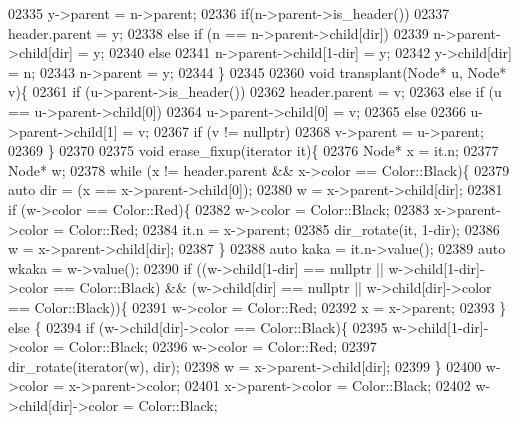 \begin{DoxyCode}
02335         y->parent = n->parent;
02336         \textcolor{keywordflow}{if}(n->parent->is\_header())
02337             header.parent = y;
02338         \textcolor{keywordflow}{else} if (n == n->parent->child[dir])
02339             n->parent->child[dir] = y;
02340         \textcolor{keywordflow}{else}
02341             n->parent->child[1-dir] = y;
02342         y->child[dir] = n;
02343         n->parent = y;
02344     \}
02345 
02360     \textcolor{keywordtype}{void} transplant(Node* u, Node* v)\{
02361         \textcolor{keywordflow}{if} (u->parent->is\_header())
02362             header.parent = v;
02363         \textcolor{keywordflow}{else} if (u == u->parent->child[0])
02364             u->parent->child[0] = v;
02365         \textcolor{keywordflow}{else}
02366             u->parent->child[1] = v;
02367         \textcolor{keywordflow}{if} (v != \textcolor{keyword}{nullptr})
02368             v->parent = u->parent;
02369     \}
02370 
02375     \textcolor{keywordtype}{void} erase\_fixup(iterator it)\{
02376         Node* x = it.n;
02377         Node* w;
02378         \textcolor{keywordflow}{while} (x != header.parent && x->color == Color::Black)\{
02379             \textcolor{keyword}{auto} dir = (x == x->parent->child[0]);
02380             w = x->parent->child[dir];
02381             \textcolor{keywordflow}{if} (w->color == Color::Red)\{
02382                 w->color = Color::Black;
02383                 x->parent->color = Color::Red;
02384                 it.n = x->parent;
02385                 dir\_rotate(it, 1-dir);
02386                 w = x->parent->child[dir];
02387             \}
02388             \textcolor{keyword}{auto} kaka = it.n->value();
02389             \textcolor{keyword}{auto} wkaka = w->value();
02390             \textcolor{keywordflow}{if} ((w->child[1-dir] == \textcolor{keyword}{nullptr} || w->child[1-dir]->color == 
      Color::Black) && (w->child[dir] == \textcolor{keyword}{nullptr} || w->child[dir]->color == Color::Black))\{
02391                 w->color = Color::Red;
02392                 x = x->parent;
02393             \} \textcolor{keywordflow}{else} \{
02394                 \textcolor{keywordflow}{if} (w->child[dir]->color == Color::Black)\{
02395                     w->child[1-dir]->color = Color::Black;
02396                     w->color = Color::Red;
02397                     dir\_rotate(iterator(w), dir);
02398                     w = x->parent->child[dir];
02399                 \}
02400                 w->color = x->parent->color;
02401                 x->parent->color = Color::Black;
02402                 w->child[dir]->color = Color::Black;

\end{DoxyCode}
